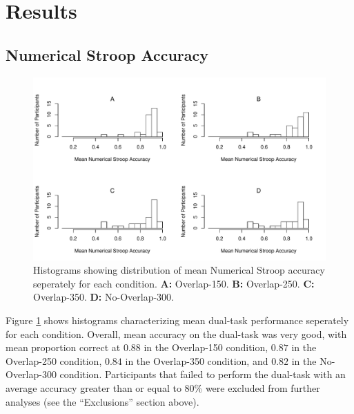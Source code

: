 \documentclass[apacite,draftfirst,man]{apa6}
\begin{document}
\section*{Results}
\subsection*{Numerical Stroop Accuracy}
\begin{figure}[t]
\centering \includegraphics[width=1.0\textwidth]{../figures/fig_exc_dual.pdf}
\caption{ Histograms showing distribution of mean Numerical Stroop accuracy
  seperately for each condition. \textbf{A:} Overlap-150. \textbf{B:} Overlap-250.
  \textbf{C:} Overlap-350. \textbf{D:} No-Overlap-300. }
    \label{fig:exc_dual}
\end{figure}

Figure \ref{fig:exc_dual} shows histograms characterizing mean dual-task
performance seperately for each condition. Overall, mean accuracy on the
dual-task was very good, with mean proportion correct at $0.88$ in the
Overlap-150 condition, $0.87$ in the Overlap-250 condition, $0.84$ in the
Overlap-350 condition, and $0.82$ in the No-Overlap-300 condition. Participants
that failed to perform the dual-task with an average accuracy greater than or
equal to 80\% were excluded from further analyses (see the ``Exclusions''
section above).
\end{document}

